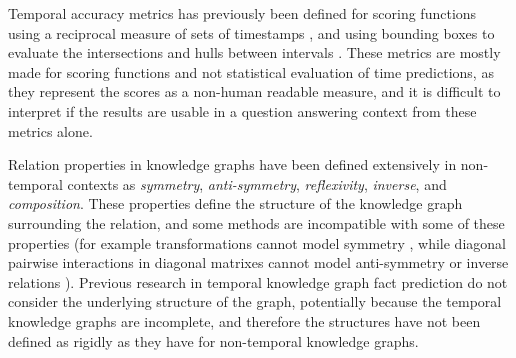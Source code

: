 Temporal accuracy metrics has previously been defined for scoring functions using a reciprocal measure of sets of timestamps \cite{surdeanu2013overviewtac}, and using bounding boxes to evaluate the intersections and hulls between intervals \cite{jain2020timeplex}. These metrics are mostly made for scoring functions and not statistical evaluation of time predictions, as they represent the scores as a non-human readable measure, and it is difficult to interpret if the results are usable in a question answering context from these metrics alone.

Relation properties in knowledge graphs have been defined extensively in non-temporal contexts as \textit{symmetry}, \textit{anti-symmetry}, \textit{reflexivity}, \textit{inverse}, and \textit{composition}. These properties define the structure of the knowledge graph surrounding the relation, and some methods are incompatible with some of these properties (for example transformations cannot model symmetry \cite{chami2020atth}, while diagonal pairwise interactions in diagonal matrixes cannot model anti-symmetry or inverse relations \cite{gregucci23sepa}). Previous research in temporal knowledge graph fact prediction do not consider the underlying structure of the graph, potentially because the temporal knowledge graphs are incomplete, and therefore the structures have not been defined as rigidly as they have for non-temporal knowledge graphs.

